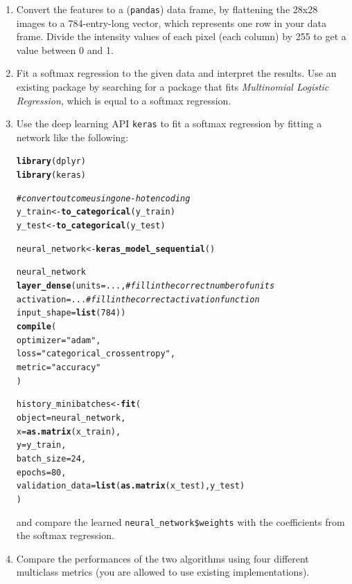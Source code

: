 \documentclass[a4paper]{article}
\makeatletter
\newcommand{\hlstr}[1]{\textcolor[rgb]{0.192,0.494,0.8}{#1}}%
\newcommand{\hlcom}[1]{\textcolor[rgb]{0.678,0.584,0.686}{\textit{#1}}}%
\newcommand{\hlkwd}[1]{\textcolor[rgb]{0.737,0.353,0.396}{\textbf{#1}}}%
\newenvironment{kframe}{%
 \def\at@end@of@kframe{}%
 \ifinner\ifhmode%
  \def\at@end@of@kframe{\end{minipage}}%
  \begin{minipage}{\columnwidth}%
 \fi\fi%
 \def\FrameCommand##1{\hskip\@totalleftmargin \hskip-\fboxsep
 \colorbox{shadecolor}{##1}\hskip-\fboxsep
     \hskip-\linewidth \hskip-\@totalleftmargin \hskip\columnwidth}%
 \MakeFramed {\advance\hsize-\width
   \@totalleftmargin\z@ \linewidth\hsize
   \@setminipage}}%
 {\par\unskip\endMakeFramed%
 \at@end@of@kframe}
\newenvironment{knitrout}{}{} %
\makeatother
\begin{document}
{\begin{enumerate}
\begin{knitrout}
{}


\end{knitrout}
\item Convert the features to a (\texttt{pandas}) data frame, by flattening the 28x28 images to a 784-entry-long vector, which represents one row in your data frame. Divide the intensity values of each pixel (each column) by 255 to get a value between 0 and 1.  



\item Fit a softmax regression to the given data and interpret the results. Use an existing package by searching for a package that fits \textit{Multinomial Logistic Regression}, which is equal to a softmax regression.

\item Use the deep learning API \texttt{keras} to fit a softmax regression by fitting a network like the following:

\begin{knitrout}
\color{fgcolor}\begin{kframe}
\begin{alltt}
\hlkwd{library}(dplyr)
\hlkwd{library}(keras)

\hlcom{# convert outcome using one-hot encoding}
y_train <- \hlkwd{to_categorical}(y_train)
y_test <- \hlkwd{to_categorical}(y_test)

neural_network <- \hlkwd{keras_model_sequential}()

neural_network %
  \hlkwd{layer_dense}(units = ..., \hlcom{# fill in the correct number of units }
              activation = ... \hlcom{# fill in the correct activation function}
              input_shape = \hlkwd{list}(784)) %
  \hlkwd{compile}(
    optimizer = \hlstr{"adam"},
    loss      = \hlstr{"categorical_crossentropy"},
    metric = \hlstr{"accuracy"}
  )

history_minibatches <- \hlkwd{fit}(
  object           = neural_network, 
  x                = \hlkwd{as.matrix}(x_train), 
  y                = y_train,
  batch_size       = 24, 
  epochs           = 80,
  validation_data = \hlkwd{list}(\hlkwd{as.matrix}(x_test), y_test)
)
\end{alltt}
\end{kframe}
\end{knitrout}

and compare the learned \texttt{neural\_network\$weights} with the coefficients from the softmax regression.

\item Compare the performances of the two algorithms using four different multiclass metrics (you are allowed to use existing implementations).

\end{enumerate}
}
\end{document}
